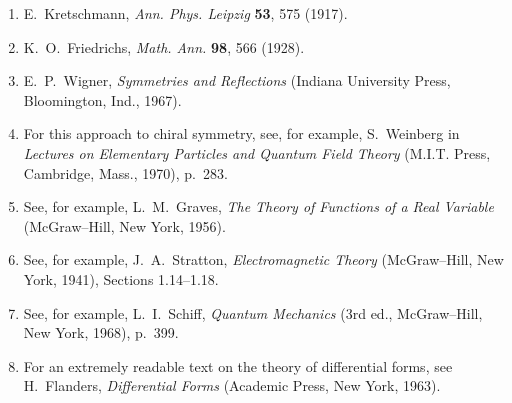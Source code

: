 

\begin{enumerate}
  \item {}\label{ch4-ref-1}
  E.~Kretschmann, \textit{Ann. Phys. Leipzig} \textbf{53}, 575 (1917).

  \item[1a.] \label{ch4-ref-1a}
  K.~O.~Friedrichs, \textit{Math. Ann.} \textbf{98}, 566 (1928).

  \item {}\label{ch4-ref-2}
  E.~P.~Wigner, \textit{Symmetries and Reflections} (Indiana University
  Press, Bloomington, Ind., 1967).

  \item {}\label{ch4-ref-3}
  For this approach to chiral symmetry, see, for example, S.~Weinberg in
  \textit{Lectures on Elementary Particles and Quantum Field Theory}
  (M.I.T. Press, Cambridge, Mass., 1970), p.~283.

  \item {}\label{ch4-ref-4}
  See, for example, L.~M.~Graves, \textit{The Theory of Functions of a Real
  Variable} (McGraw--Hill, New York, 1956).

  \item {}\label{ch4-ref-5}
  See, for example, J.~A.~Stratton, \textit{Electromagnetic Theory}
  (McGraw--Hill, New York, 1941), Sections 1.14--1.18.

  \item {}\label{ch4-ref-6}
  See, for example, L.~I.~Schiff, \textit{Quantum Mechanics} (3rd ed.,
  McGraw--Hill, New York, 1968), p.~399.

  \item {}\label{ch4-ref-7}
  For an extremely readable text on the theory of differential forms, see
  H.~Flanders, \textit{Differential Forms} (Academic Press, New York, 1963).
\end{enumerate}
